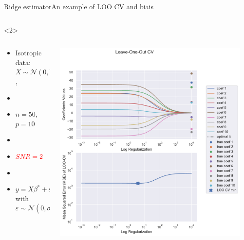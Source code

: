 \documentclass[10pt,aspectratio=43]{beamer}
\begin{document}
\begin{frame}{Ridge estimator}{An example of LOO CV and biais}
\begin{onlyenv}
\begin{columns}
\begin{column}{0.7\textwidth}
\begin{center}
                 \end{center}
            \end{column}
            \end{columns}
    \end{onlyenv}
    \begin{onlyenv}<2>
        \begin{columns}
            \begin{column}{0.4\textwidth}
                \begin{itemize}
                    \item Isotropic data: $X\sim\mathcal{N}(0,\mathrm{Id})$,
                    \item[]
                    \item $n=50$, $p=10$
                    \item[]
                    \item \textcolor{red}{$SNR=2$}
                    \item[]
                    \item $y = X\beta^*+\varepsilon$ with $\varepsilon\sim \mathcal{N}(0, \sigma^2\mathrm{Id})$
                \end{itemize}
            \end{column}
            \begin{column}{0.7\textwidth}
                \begin{center}
                        \includegraphics[width=0.95\textwidth]{path_ridge_complete_2_.pdf}

\end{center}
\end{column}
\end{columns}
\end{onlyenv}
\end{frame}
\end{document}
